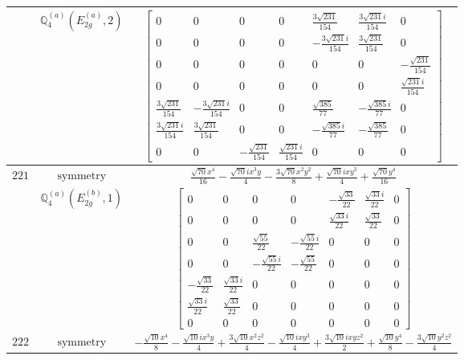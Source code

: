 \documentclass[fleqn,8pt,landscape]{jsarticle}
\begin{document}
\begin{longtable}{ccc}
$  $ & $ \mathbb{Q}_{4}^{(a)}(E_{2g}^{(a)},2) $ & $ \begin{bmatrix} 0 & 0 & 0 & 0 & \frac{3 \sqrt{231}}{154} & \frac{3 \sqrt{231} i}{154} & 0 \\ 0 & 0 & 0 & 0 & - \frac{3 \sqrt{231} i}{154} & \frac{3 \sqrt{231}}{154} & 0 \\ 0 & 0 & 0 & 0 & 0 & 0 & - \frac{\sqrt{231}}{154} \\ 0 & 0 & 0 & 0 & 0 & 0 & \frac{\sqrt{231} i}{154} \\ \frac{3 \sqrt{231}}{154} & - \frac{3 \sqrt{231} i}{154} & 0 & 0 & \frac{\sqrt{385}}{77} & - \frac{\sqrt{385} i}{77} & 0 \\ \frac{3 \sqrt{231} i}{154} & \frac{3 \sqrt{231}}{154} & 0 & 0 & - \frac{\sqrt{385} i}{77} & - \frac{\sqrt{385}}{77} & 0 \\ 0 & 0 & - \frac{\sqrt{231}}{154} & \frac{\sqrt{231} i}{154} & 0 & 0 & 0 \end{bmatrix} $ \\ \hline
$ 221 $ & $ \text{symmetry} $ & $ \frac{\sqrt{70} x^{4}}{16} - \frac{\sqrt{70} i x^{3} y}{4} - \frac{3 \sqrt{70} x^{2} y^{2}}{8} + \frac{\sqrt{70} i x y^{3}}{4} + \frac{\sqrt{70} y^{4}}{16} $ \\
$  $ & $ \mathbb{Q}_{4}^{(a)}(E_{2g}^{(b)},1) $ & $ \begin{bmatrix} 0 & 0 & 0 & 0 & - \frac{\sqrt{33}}{22} & \frac{\sqrt{33} i}{22} & 0 \\ 0 & 0 & 0 & 0 & \frac{\sqrt{33} i}{22} & \frac{\sqrt{33}}{22} & 0 \\ 0 & 0 & \frac{\sqrt{55}}{22} & - \frac{\sqrt{55} i}{22} & 0 & 0 & 0 \\ 0 & 0 & - \frac{\sqrt{55} i}{22} & - \frac{\sqrt{55}}{22} & 0 & 0 & 0 \\ - \frac{\sqrt{33}}{22} & \frac{\sqrt{33} i}{22} & 0 & 0 & 0 & 0 & 0 \\ \frac{\sqrt{33} i}{22} & \frac{\sqrt{33}}{22} & 0 & 0 & 0 & 0 & 0 \\ 0 & 0 & 0 & 0 & 0 & 0 & 0 \end{bmatrix} $ \\ \hline
$ 222 $ & $ \text{symmetry} $ & $ - \frac{\sqrt{10} x^{4}}{8} - \frac{\sqrt{10} i x^{3} y}{4} + \frac{3 \sqrt{10} x^{2} z^{2}}{4} - \frac{\sqrt{10} i x y^{3}}{4} + \frac{3 \sqrt{10} i x y z^{2}}{2} + \frac{\sqrt{10} y^{4}}{8} - \frac{3 \sqrt{10} y^{2} z^{2}}{4} $ \\

\end{longtable}
\end{document}
